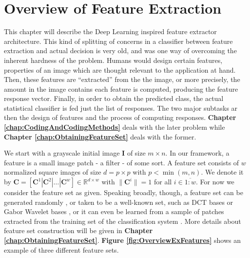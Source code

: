 \documentclass[12pt,a4paper,oneside,english]{UPBThesis}
\newcommand{\hctimes}[2]{{#1}\!\times\!{#2}}
\newcommand{\hcrange}[2]{\overline{{#1}\colon\!\!{#2}}}
\begin{document}
\clearpage
\newpage
\thispagestyle{empty}
\mbox{}

\chapter{Overview of Feature Extraction}
\label{chap:OverviewFeatureExtraction}

This chapter will describe the Deep Learning inspired feature extractor architecture. This kind of splitting of concerns in a classifier between feature extraction and actual decision is very old, and was one way of overcoming the inherent hardness of the problem. Humans would design certain features, properties of an image which are thought relevant to the application at hand. Then, these features are ``extracted'' from the the image, or more precisely, the amount in the image contains each feature is computed, producing the feature response vector. Finally, in order to obtain the predicted class, the actual statistical classifier is fed just the list of responses. The two major subtasks ar then the design of features and the process of computing responses. \textbf{Chapter \ref{chap:CodingAndCodingMethods}} deals with the later problem while \textbf{Chapter \ref{chap:ObtainingFeatureSet}} deals with the former.

We start with a grayscale initial image $\textbf{I}$ of size $\hctimes{m}{n}$. In our framework, a feature is a small image patch - a filter - of some sort. A feature set consists of $w$ normalized square images of size $d = \hctimes{p}{p}$ with $p < \min(m,n)$. We denote it by $\textbf{C} = \left[ \textbf{C}^1 \left|\right. \textbf{C}^2 \left|\right. \dots \left|\right. \textbf{C}^w \right] \in \mathbb{R}^{\hctimes{d}{w}}$ with $\|\mathbf{C}^i\| = 1$ for all $i \in \hcrange{1}{w}$. For now we consider the feature set as given. Speaking broadly, though, a feature set can be generated randomly \cite{random-weights-feature-learning,beyond-simple-features}, or taken to be a well-known set, such as DCT bases or Gabor Wavelet bases \cite{simple-method-sparse-coding}, or it can even be learned from a sample of patches extracted from the training set of the classification system \cite{emergence-sparse-coding,sparse-coding-strategy-V1,tiny-images}. More details about feature set construction will be given in \textbf{Chapter \ref{chap:ObtainingFeatureSet}}. \textbf{Figure \ref{fig:OverviewExFeatures}} shows an example of three different feature sets.
\end{document}

